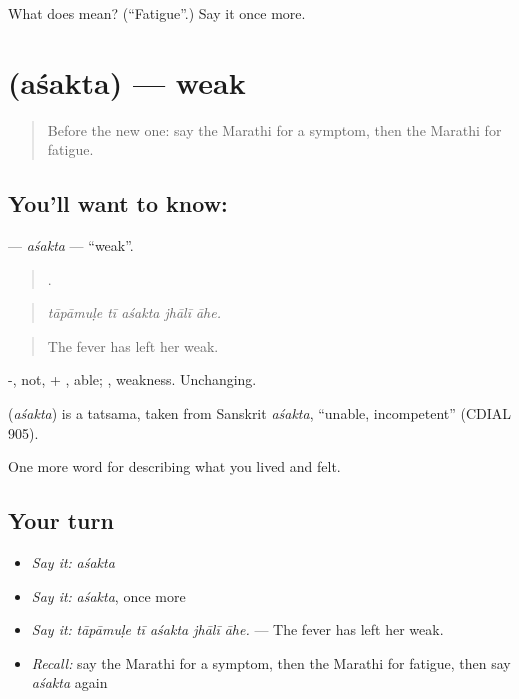 \begin{tcolorbox}[breakable,colback=teal!4,colframe=teal!35!black,title={Before you move on}]
What does  mean? (\textquotedblleft{}Fatigue\textquotedblright{}.) Say it once more.
\end{tcolorbox}
\section[\texorpdfstring{\mr{अशक्त} (aśakta)}{अशक्त (aśakta)}]{ (aśakta) — weak}

\label{lesson:MR-C480-asakta}



\begin{quote}
Before the new one: say the Marathi for a symptom, then the Marathi for fatigue.
\end{quote}

\subsection*{You'll want to know: }
\textbf{} — \emph{aśakta} — \textquotedblleft{}weak\textquotedblright{}.

\begin{quote}
    .
\end{quote}

\begin{quote}
\emph{tāpāmuḷe tī aśakta jhālī āhe.}
\end{quote}

\begin{quote}
The fever has left her weak.
\end{quote}

-, not, + , able; , weakness. Unchanging.

\begin{cousinweb}
\textbf{} (\emph{aśakta}) is a tatsama, taken from Sanskrit \emph{aśakta}, \textquotedblleft{}unable, incompetent\textquotedblright{} (CDIAL 905).
\end{cousinweb}

\begin{grammarlens}[title={What you've built}]
One more word for describing what you lived and felt.
\end{grammarlens}

\subsection*{Your turn}
\begin{itemize}
\raggedright
  \item \emph{Say it:} \emph{aśakta}
  \item \emph{Say it:} \emph{aśakta}, once more
  \item \emph{Say it:} \emph{tāpāmuḷe tī aśakta jhālī āhe.} — The fever has left her weak.
  \item \emph{Recall:} say the Marathi for a symptom, then the Marathi for fatigue, then say \emph{aśakta} again
\end{itemize}

